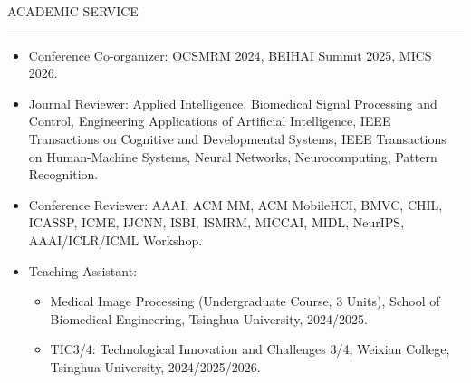 \documentclass{resume} %
\renewenvironment{rSection}[1]{
\sectionskip
\textcolor{TsinghuaPurple}{\MakeUppercase{#1}}
\sectionlineskip
\hrule
\begin{list}{}{
\setlength{\leftmargin}{0em}
}
\item[]
}{
\end{list}
}
\begin{document}
\begin{rSection}{Academic Service} 
\begin{itemize}
    \item Conference Co-organizer: \href{http://www.ocsmrm.org/}{OCSMRM 2024}, \href{https://www.medcircle.cn/meeting/index/2025bs}{BEIHAI Summit 2025}, MICS 2026.
    \item Journal Reviewer: Applied Intelligence, Biomedical Signal Processing and Control, Engineering Applications of Artificial Intelligence, IEEE Transactions on Cognitive and Developmental Systems, IEEE Transactions on Human-Machine Systems, Neural Networks, Neurocomputing, Pattern Recognition.
    \item Conference Reviewer: AAAI, ACM MM, ACM MobileHCI, BMVC, CHIL, ICASSP, ICME, IJCNN, ISBI, ISMRM, MICCAI, MIDL, NeurIPS, AAAI/ICLR/ICML Workshop.

    \item Teaching Assistant: 
    \begin{itemize}
        \item Medical Image Processing (Undergraduate Course, 3 Units), School of Biomedical Engineering, Tsinghua University, 2024/2025.
        \item TIC3/4: Technological Innovation and Challenges 3/4, Weixian College, Tsinghua University, 2024/2025/2026.
    \end{itemize}
\end{itemize}
\end{rSection}
\end{document}
